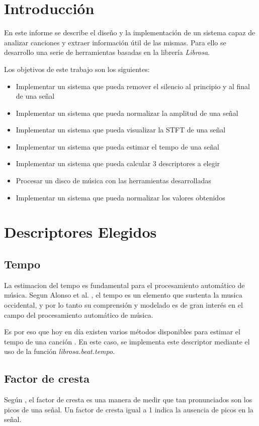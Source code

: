 \documentclass[]{article}
\begin{document}
\begin{multicols}{2}
\section{Introducción}
\label{sec: intro}
En este informe se describe el diseño y la implementación de un sistema capaz de
analizar canciones y extraer información útil de las mismas. Para ello se desarrollo
una serie de herramientas basadas en la librería \textit{Librosa}.

Los objetivos de este trabajo son los siguientes:
\begin{itemize}
  \item Implementar un sistema que pueda remover el silencio al principio y al final de una señal
  \item Implementar un sistema que pueda normalizar la amplitud de una señal
  \item Implementar un sistema que pueda visualizar la STFT de una señal
  \item Implementar un sistema que pueda estimar el tempo de una señal
  \item Implementar un sistema que pueda calcular 3 descriptores a elegir
  \item Procesar un disco de música con las herramientas desarrolladas
  \item Implementar un sistema que pueda normalizar los valores obtenidos
\end{itemize}

\section{Descriptores Elegidos}

\subsection{Tempo}
La estimacion del tempo es fundamental para el procesamiento automático de música.
Segun Alonso et al. \cite{alonso2004tempo}, el tempo es un elemento que sustenta
la musica occidental, y por lo tanto su comprensión y modelado es de gran interés
en el campo del procesamiento automático de música.

Es por eso que hoy en día existen varios métodos disponibles para estimar el tempo
de una canción \cite{goto1997issues}. En este caso, se implementa este descriptor
mediante el uso de la función \emph{{librosa.beat.tempo}}.
\subsection{Factor de cresta}
Según \cite{ wiki:crest}{}, el factor de cresta es una manera de medir que tan
pronunciados son los picos de una señal. Un factor de cresta igual a 1 indica
la ausencia de picos en la señal.


\end{multicols}
\end{document}
